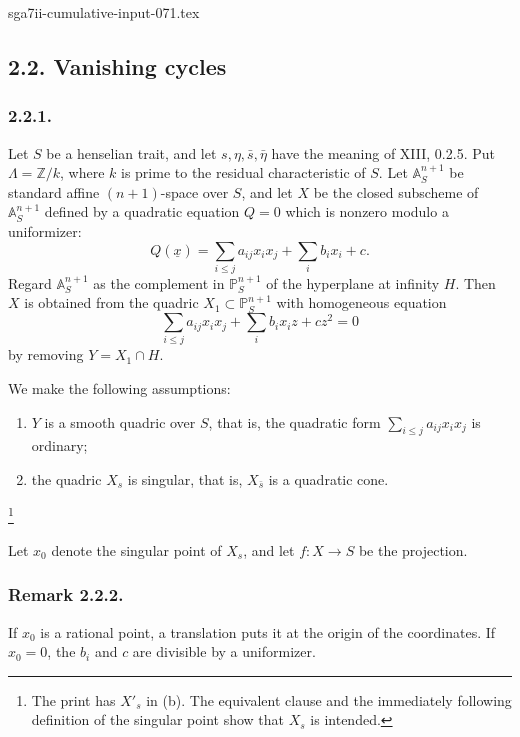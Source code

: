 \begin{filecontents*}{sga7ii-cumulative-input-071.tex}
\subsection*{2.2. Vanishing cycles}

\subsubsection*{2.2.1.}
Let $S$ be a henselian trait, and let
$s,\eta,\bar s,\bar\eta$ have the meaning of XIII, 0.2.5.  Put
$\Lambda=\mathbb Z/k$, where $k$ is prime to the residual
characteristic of $S$.  Let $\mathbb A^{n+1}_S$ be standard affine
$(n+1)$-space over $S$, and let $X$ be the closed subscheme of
$\mathbb A^{n+1}_S$ defined by a quadratic equation $Q=0$ which is
nonzero modulo a uniformizer:
\[
Q(\underline x)=\sum_{i\leq j}a_{ij}x_ix_j+\sum_i b_ix_i+c.
\]
Regard $\mathbb A^{n+1}_S$ as the complement in
$\mathbb P^{n+1}_S$ of the hyperplane at infinity $H$.  Then $X$ is
obtained from the quadric $X_1\subset\mathbb P^{n+1}_S$ with
homogeneous equation
\begin{equation}\tag{2.2.1.1}
\sum_{i\leq j}a_{ij}x_ix_j+\sum_i b_ix_iz+cz^2=0
\end{equation}
by removing $Y=X_1\cap H$.

We make the following assumptions:

\begin{enumerate}
\item[(a)] $Y$ is a smooth quadric over $S$, that is, the quadratic
form $\sum_{i\leq j}a_{ij}x_ix_j$ is ordinary;

\item[(b)] the quadric $X_s$ is singular, that is,
$X_{\bar s}$ is a quadratic cone.
\end{enumerate}
\footnote{The print has $X'_s$ in (b).  The equivalent clause and the
immediately following definition of the singular point show that
$X_s$ is intended.}

Let $x_0$ denote the singular point of $X_s$, and let
$f:X\to S$ be the projection.

\subsubsection*{Remark 2.2.2.}
If $x_0$ is a rational point, a translation puts it at the origin of
the coordinates.  If $x_0=0$, the $b_i$ and $c$ are divisible by a
uniformizer.


\end{filecontents*}
